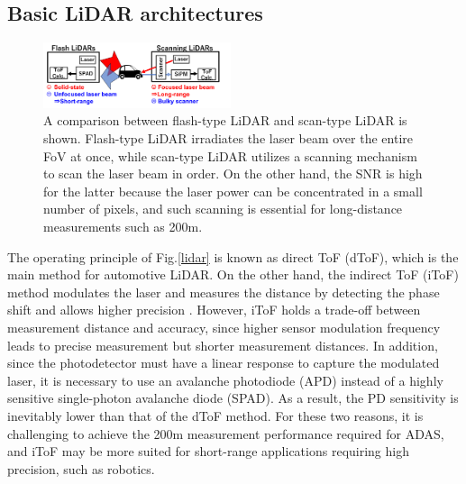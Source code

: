 \documentclass[paper]{ieice}
\begin{document}

\subsection{Basic LiDAR architectures}
\begin{figure}[!t]
\centering
 \includegraphics[width=0.49\textwidth]{figs/flashscan.png}
  \caption{A comparison between flash-type LiDAR and scan-type LiDAR is shown. Flash-type LiDAR irradiates the laser beam over the entire FoV at once, while scan-type LiDAR utilizes a scanning mechanism to scan the laser beam in order. On the other hand, the SNR is high for the latter because the laser power can be concentrated in a small number of pixels, and such scanning is essential for long-distance measurements such as 200m.}
\label{flash}
\end{figure}

\qquad The operating principle of Fig.\ref{lidar} is known as direct ToF (dToF), which is the main method for automotive LiDAR. On the other hand, the indirect ToF (iToF) method modulates the laser and measures the distance by detecting the phase shift and allows higher precision \cite{kawahito2007cmos, bamji20140, bamji2018impixel, keel2019vga}. However, iToF holds a trade-off between measurement distance and accuracy, since higher sensor modulation frequency leads to precise measurement but shorter measurement distances. In addition, since the photodetector must have a linear response to capture the modulated laser, it is necessary to use an avalanche photodiode (APD) instead of a highly sensitive single-photon avalanche diode (SPAD). As a result, the PD sensitivity is inevitably lower than that of the dToF method. For these two reasons, it is challenging to achieve the 200m measurement performance required for ADAS, and iToF may be more suited for short-range applications requiring high precision, such as robotics\cite{yoshioka2021through}.
\end{document}
